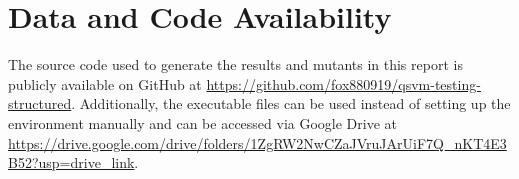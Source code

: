 \documentclass[12pt,a4paper]{article}
\begin{document}
	
	\section*{Data and Code Availability}
	The source code used to generate the results and mutants in this report is publicly available on GitHub at \url{https://github.com/fox880919/qsvm-testing-structured}. Additionally, the executable files can be used instead of setting up the environment manually and can be accessed via Google Drive at \url{https://drive.google.com/drive/folders/1ZgRW2NwCZaJVruJArUiF7Q_nKT4E3B52?usp=drive_link}.
	
	
		
	
	\clearpage 
	
\end{document}
